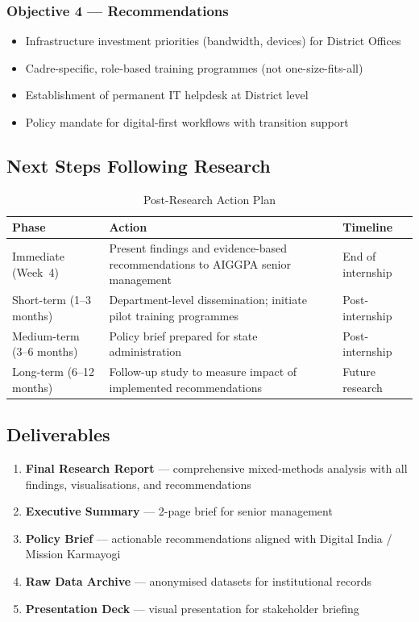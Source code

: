 \documentclass[12pt,a4paper]{article}
\begin{document}
\subsubsection*{\color{accentpurple}Objective 4 --- Recommendations}
\begin{itemize}[leftmargin=1.5em, itemsep=2pt]
    \item Infrastructure investment priorities (bandwidth, devices) for District Offices
    \item Cadre-specific, role-based training programmes (not one-size-fits-all)
    \item Establishment of permanent IT helpdesk at District level
    \item Policy mandate for digital-first workflows with transition support
\end{itemize}

\subsection{Next Steps Following Research}

\begin{table}[H]
\centering
\caption{Post-Research Action Plan}
\small
\begin{tabularx}{\textwidth}{L{3.5cm} X L{3cm}}
\toprule
\textbf{Phase} & \textbf{Action} & \textbf{Timeline} \\
\midrule
Immediate (Week~4) & Present findings and evidence-based recommendations to AIGGPA senior management & End of internship \\[4pt]
Short-term (1--3 months) & Department-level dissemination; initiate pilot training programmes & Post-internship \\[4pt]
Medium-term (3--6 months) & Policy brief prepared for state administration & Post-internship \\[4pt]
Long-term (6--12 months) & Follow-up study to measure impact of implemented recommendations & Future research \\
\bottomrule
\end{tabularx}
\end{table}

\subsection{Deliverables}

\begin{enumerate}[leftmargin=1.5em, itemsep=4pt]
    \item \textbf{Final Research Report} --- comprehensive mixed-methods analysis with all findings, visualisations, and recommendations
    \item \textbf{Executive Summary} --- 2-page brief for senior management
    \item \textbf{Policy Brief} --- actionable recommendations aligned with Digital India / Mission Karmayogi
    \item \textbf{Raw Data Archive} --- anonymised datasets for institutional records
    \item \textbf{Presentation Deck} --- visual presentation for stakeholder briefing
\end{enumerate}
\end{document}
